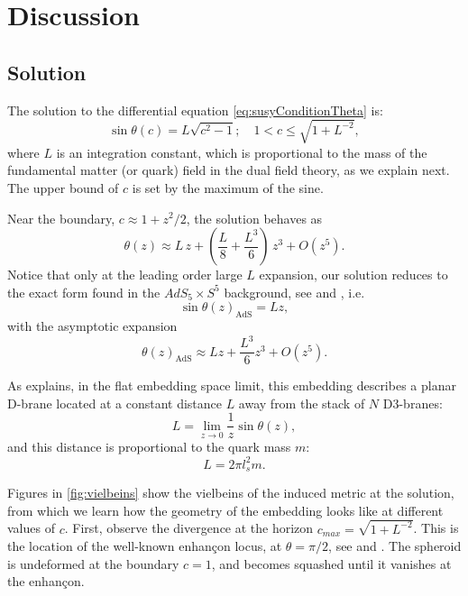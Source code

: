 \section{Discussion}\label{sec:discussion}

\subsection{Solution}\label{sec:solution}

The solution to the differential equation \eqref{eq:susyConditionTheta} is:
\begin{equation}\label{eq:susyConditionSolution}
\boxed{\sin\theta(c) = L \sqrt{c^2-1}; \quad 1 < c \leq \sqrt{1+L^{-2}}},
\end{equation}
where $L$ is an integration constant, which is proportional to the mass of the fundamental matter (or quark) field in the dual field theory, as we explain next. The upper bound of $c$ is set by the maximum of the sine.

Near the boundary, $c \approx 1 + z^2/2$, the solution behaves as
\begin{equation} \label{eq:thetaExpanded}
 \theta(z) \approx L \, z + \left(\frac{L}{8} +\frac{L^3}{6} \right) \, z^3 + O(z^5).
\end{equation} 
Notice that only at the leading order large $L$ expansion, our solution reduces to the exact form found in the $AdS_5 \times S^5$ background, see \cite{Karch:2002sh} and \cite{Karch:2005ms}, i.e.
\begin{equation}
 \sin\theta(z)_\text{AdS} = L z,
\end{equation}
with the asymptotic expansion
\begin{equation}
\theta(z)_\text{AdS} \approx L z + \frac{L^3}{6} z^3 + O(z^5).
\end{equation}

As \cite{Karch:2005ms} explains, in the flat embedding space limit, this embedding describes a planar D-brane located at a constant distance $L$ away from the stack of $N$ D3-branes:
\begin{equation}
 L = \lim_{z \rightarrow 0 } \frac{1}{z} \sin\theta(z),
\end{equation}
and this distance is proportional to the quark mass $m$:
\begin{equation}
 L = 2 \pi l_s^2 m.
\end{equation}


Figures in \ref{fig:vielbeins} show the vielbeins of the induced metric at the solution, from which we learn how the geometry of the embedding looks like at different values of $c$. First, observe the divergence at the horizon $c_{max}=\sqrt{1+L^{-2}}$. This is the location of the well-known enhançon locus, at $\theta = \pi/2$, see \cite{Buchel:2000cn} and \cite{Evans:2000ct}. The spheroid is undeformed at the boundary $c=1$, and becomes squashed until it vanishes at the enhançon. 

